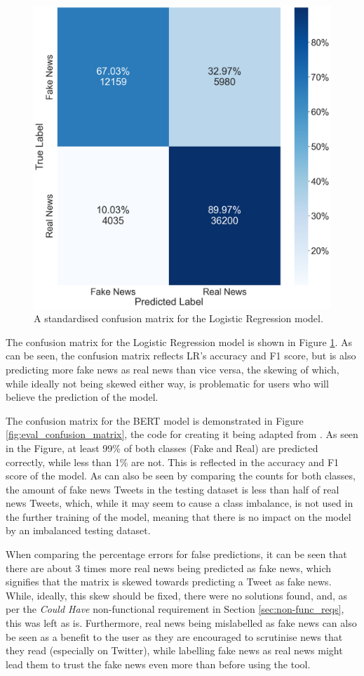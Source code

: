 \documentclass{l4proj}
\begin{document}
\begin{figure}
    \centering
    \includegraphics[width=0.8\linewidth]{images/Evaluation/LR conf matrix.png}    

    \caption{A standardised confusion matrix for the Logistic Regression model.}
    \label{fig:eval_LR_confusion_matrix} 
\end{figure}

The confusion matrix for the Logistic Regression model is shown in Figure \ref{fig:eval_LR_confusion_matrix}. As can be seen, the confusion matrix reflects LR's accuracy and F1 score, but is also predicting more fake news as real news than vice versa, the skewing of which, while ideally not being skewed either way, is problematic for users who will believe the prediction of the model.

The confusion matrix for the BERT model is demonstrated in Figure \ref{fig:eval_confusion_matrix}, the code for creating it being adapted from \citet{ConfMatrixPct}. As seen in the Figure, at least 99\% of both classes (Fake and Real) are predicted correctly, while less than 1\% are not. This is reflected in the accuracy and F1 score of the model. As can also be seen by comparing the counts for both classes, the amount of fake news Tweets in the testing dataset is less than half of real news Tweets, which, while it may seem to cause a class imbalance, is not used in the further training of the model, meaning that there is no impact on the model by an imbalanced testing dataset.

When comparing the percentage errors for false predictions, it can be seen that there are about 3 times more real news being predicted as fake news, which signifies that the matrix is skewed towards predicting a Tweet as fake news. While, ideally, this skew should be fixed, there were no solutions found, and, as per the \textit{Could Have} non-functional requirement in Section \ref{sec:non-func_reqs}, this was left as is. Furthermore, real news being mislabelled as fake news can also be seen as a benefit to the user as they are encouraged to scrutinise news that they read (especially on Twitter), while labelling fake news as real news might lead them to trust the fake news even more than before using the tool.
\end{document}
